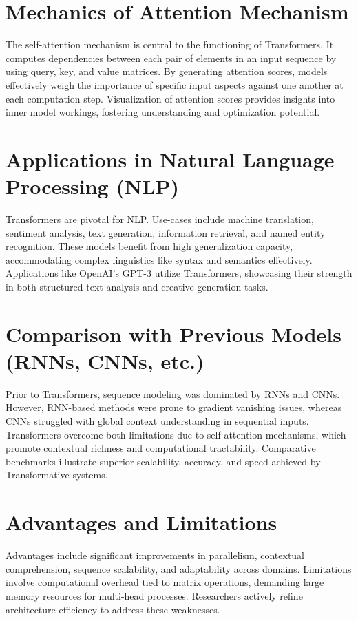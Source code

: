 \documentclass{article}
\begin{document}
\section{Mechanics of Attention Mechanism}
The self-attention mechanism is central to the functioning of Transformers. It computes dependencies between each pair of elements in an input sequence by using query, key, and value matrices. By generating attention scores, models effectively weigh the importance of specific input aspects against one another at each computation step. Visualization of attention scores provides insights into inner model workings, fostering understanding and optimization potential.

\section{Applications in Natural Language Processing (NLP)}
Transformers are pivotal for NLP. Use-cases include machine translation, sentiment analysis, text generation, information retrieval, and named entity recognition. These models benefit from high generalization capacity, accommodating complex linguistics like syntax and semantics effectively. Applications like OpenAI's GPT-3 utilize Transformers, showcasing their strength in both structured text analysis and creative generation tasks.

\section{Comparison with Previous Models (RNNs, CNNs, etc.)}
Prior to Transformers, sequence modeling was dominated by RNNs and CNNs. However, RNN-based methods were prone to gradient vanishing issues, whereas CNNs struggled with global context understanding in sequential inputs. Transformers overcome both limitations due to self-attention mechanisms, which promote contextual richness and computational tractability. Comparative benchmarks illustrate superior scalability, accuracy, and speed achieved by Transformative systems.

\section{Advantages and Limitations}
Advantages include significant improvements in parallelism, contextual comprehension, sequence scalability, and adaptability across domains. Limitations involve computational overhead tied to matrix operations, demanding large memory resources for multi-head processes. Researchers actively refine architecture efficiency to address these weaknesses.
\end{document}
